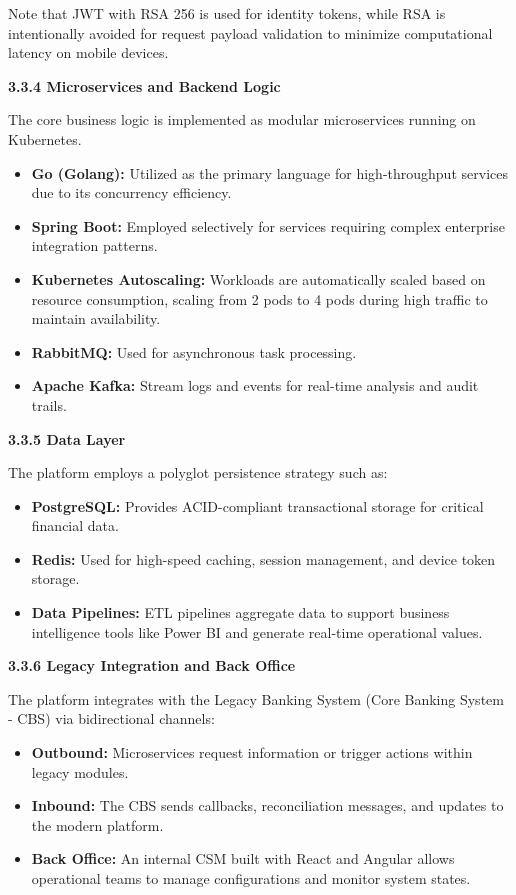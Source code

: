 Note that JWT with RSA 256 is used for identity tokens, while RSA is
intentionally avoided for request payload validation to minimize
computational latency on mobile devices.

\textbf{3.3.4 Microservices and Backend Logic}

The core business logic is implemented as modular microservices running
on Kubernetes.

\begin{itemize}
\item
  \textbf{Go (Golang):} Utilized as the primary language for
  high-throughput services due to its concurrency efficiency.
\item
  \textbf{Spring Boot:} Employed selectively for services requiring
  complex enterprise integration patterns.
\item
  \textbf{Kubernetes Autoscaling:} Workloads are automatically scaled
  based on resource consumption, scaling from 2 pods to 4 pods during
  high traffic to maintain availability.
\item
  \textbf{RabbitMQ:} Used for asynchronous task processing.
\item
  \textbf{Apache Kafka:} Stream logs and events for real-time analysis
  and audit trails.
\end{itemize}

\textbf{3.3.5 Data Layer}

The platform employs a polyglot persistence strategy such as:

\begin{itemize}
\item
  \textbf{PostgreSQL:} Provides ACID-compliant transactional storage for
  critical financial data.
\item
  \textbf{Redis:} Used for high-speed caching, session management, and
  device token storage.
\item
  \textbf{Data Pipelines:} ETL pipelines aggregate data to support
  business intelligence tools like Power BI and generate real-time
  operational values.
\end{itemize}

\textbf{3.3.6 Legacy Integration and Back Office}

The platform integrates with the Legacy Banking System (Core Banking
System - CBS) via bidirectional channels:

\begin{itemize}
\item
  \textbf{Outbound:} Microservices request information or trigger
  actions within legacy modules.
\item
  \textbf{Inbound:} The CBS sends callbacks, reconciliation messages,
  and updates to the modern platform.
\item
  \textbf{Back Office:} An internal CSM built with React and Angular
  allows operational teams to manage configurations and monitor system
  states.
\end{itemize}

